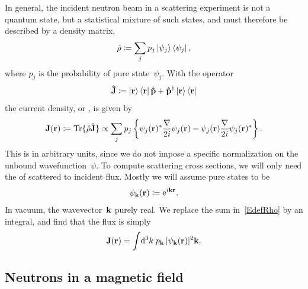 In general, the incident neutron beam in a scattering experiment
is not a  quantum state,
%
%
but a statistical mixture of such states,
%
and must therefore be described by a density matrix,
%
%
\begin{equation}\label{EdefRho}
  \hat\rho \coloneqq \sum_j p_j \ket{\psi_j}\bra{\psi_j},
\end{equation}
where $p_j$ is the probability of pure state~$\psi_j$.
%
With the operator
\begin{equation}\label{EdefJop}
  \mathbf{\hat J} \coloneqq  \ket{\mathbf{r}}\bra{\mathbf{r}}\mathbf{\hat p} + \mathbf{\hat p}^\dagger\ket{\mathbf{r}}\bra{\mathbf{r}}
\end{equation}
the current density, or ,
%
%
is given by
\begin{equation}\label{EdefJ}
  \mathbf{J}(\mathbf{r})
  \coloneqq \operatorname{Tr}\{\hat\rho \hat{\mathbf{J}}\}
  \propto \sum_j p_j\left\{ \psi_j(\mathbf{r})^*\frac{\mathbf{\nabla}}{2i}\psi_j(\mathbf{r})
                        - \psi_j(\mathbf{r})\frac{\mathbf{\nabla}}{2i}\psi_j(\mathbf{r})^*\right\}.
\end{equation}
%
This is in arbitrary units,
%
since we do not impose a specific normalization
%
on the unbound wavefunction~$\psi$.
To compute scattering cross sections,
%
%
we will only need the  of scattered to incident flux.
Mostly we will assume pure states to be 
%
%
\begin{equation}\label{EplaneWave}
  \psi_{\mathbf{k}}(\mathbf{r})\coloneqq\mathrm e^{i\mathbf{k}\mathbf{r}}.
\end{equation}
In vacuum, the wavevector~$\mathbf{k}$ purely real.
%
We replace the sum in~\cref{EdefRho} by an integral,
and find that the flux is simply
\begin{equation}
  \mathbf{J}(\mathbf{r}) = \int\!\mathrm d^3k\; p_{\mathbf{k}}\, |\psi_{\mathbf{k}}(\mathbf{r})|^2 \mathbf{k}.
\end{equation}

\subsection{Neutrons in a magnetic field}\label{SnSpinor}


